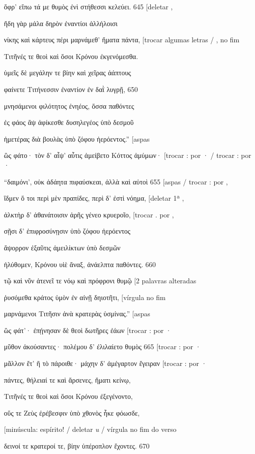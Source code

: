 ὄφρ' εἴπω τά με θυμὸς ἐνὶ στήθεσσι κελεύει. 645 {[}deletar ,

ἤδη γὰρ μάλα δηρὸν ἐναντίοι ἀλλήλοισι

νίκης καὶ κάρτευς πέρι μαρνάμεθ' ἤματα πάντα, {[}trocar algumas letras /
, no fim

Τιτῆνές τε θεοὶ καὶ ὅσοι Κρόνου ἐκγενόμεσθα.

ὑμεῖς δὲ μεγάλην τε βίην καὶ χεῖρας ἀάπτους

φαίνετε Τιτήνεσσιν ἐναντίον ἐν δαῒ λυγρῇ, 650

μνησάμενοι φιλότητος ἐνηέος, ὅσσα παθόντες

ἐς φάος ἂψ ἀφίκεσθε δυσηλεγέος ὑπὸ δεσμοῦ

ἡμετέρας διὰ βουλὰς ὑπὸ ζόφου ἠερόεντος.'' {[}aspas

ὣς φάτο· τὸν δ' αἶψ' αὖτις ἀμείβετο Κόττος ἀμύμων· {[}trocar : por · /
trocar : por ·

``δαιμόνι', οὐκ ἀδάητα πιφαύσκεαι, ἀλλὰ καὶ αὐτοὶ 655 {[}aspas / trocar
: por ,

ἴδμεν ὅ τοι περὶ μὲν πραπίδες, περὶ δ' ἐστὶ νόημα, {[}deletar 1ª ,

ἀλκτὴρ δ' ἀθανάτοισιν ἀρῆς γένεο κρυεροῖο, {[}trocar . por ,

σῇσι δ' ἐπιφροσύνῃσιν ὑπὸ ζόφου ἠερόεντος

ἄψορρον ἐξαῦτις ἀμειλίκτων ὑπὸ δεσμῶν

ἠλύθομεν, Κρόνου υἱὲ ἄναξ, ἀνάελπτα παθόντες. 660

τῷ καὶ νῦν ἀτενεῖ τε νόῳ καὶ πρόφρονι θυμῷ {[}2 palavras alteradas

ῥυσόμεθα κράτος ὑμὸν ἐν αἰνῇ δηιοτῆτι, {[}vírgula no fim

μαρνάμενοι Τιτῆσιν ἀνὰ κρατερὰς ὑσμίνας.'' {[}aspas

ὣς φάτ'· ἐπῄνησαν δὲ θεοὶ δωτῆρες ἐάων {[}trocar : por ·

μῦθον ἀκούσαντες· πολέμου δ' ἐλιλαίετο θυμὸς 665 {[}trocar : por ·

μᾶλλον ἔτ' ἢ τὸ πάροιθε· μάχην δ' ἀμέγαρτον ἔγειραν {[}trocar : por ·

πάντες, θήλειαί τε καὶ ἄρσενες, ἤματι κείνῳ,

Τιτῆνές τε θεοὶ καὶ ὅσοι Κρόνου ἐξεγένοντο,

οὕς τε Ζεὺς ἐρέβεσφιν ὑπὸ χθονὸς ἧκε φόωσδε,

{[}minúscula: espírito! / deletar \emph{u} / vírgula no fim do verso

δεινοί τε κρατεροί τε, βίην ὑπέροπλον ἔχοντες. 670

